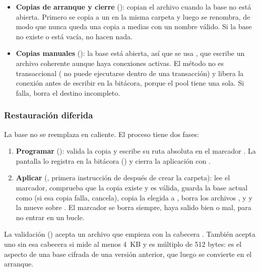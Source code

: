 \begin{itemize}
	\item \textbf{Copias de arranque y cierre} (): copian el archivo
	       cuando la base no está abierta. Primero se copia a un  en la misma carpeta y luego se
	      renombra, de modo que nunca queda una copia a medias con un nombre válido. Si la base no existe o está vacía, no
	      hacen nada.
	\item \textbf{Copias manuales} (): la base está abierta, así que se
	      usa , que escribe un archivo coherente aunque haya conexiones activas. El método
	      no es transaccional ( no puede ejecutarse dentro de una transacción) y libera la conexión antes de
	      escribir en la bitácora, porque el pool tiene una sola. Si falla, borra el destino incompleto.
\end{itemize}

\subsubsection{Restauración diferida}

La base no se reemplaza en caliente. El proceso tiene dos fases:

\begin{enumerate}
	\item \textbf{Programar} (): valida la copia y escribe su ruta absoluta en
	      el marcador . La pantalla lo registra en la bitácora
	      () y cierra la aplicación con .
	\item \textbf{Aplicar} (, primera instrucción de  después
	      de crear la carpeta): lee el marcador, comprueba que la copia existe y es válida, guarda la base actual como
	       (si esa copia falla, cancela), copia la elegida a ,
	      borra los archivos ,  y  y la mueve sobre . El marcador
	      se borra siempre, haya salido bien o mal, para no entrar en un bucle.
\end{enumerate}

La validación () acepta un archivo que empieza con la cabecera
. También acepta uno sin esa cabecera si mide al menos 4~KB y es múltiplo de 512
bytes: es el aspecto de una base cifrada de una versión anterior, que luego se convierte en el arranque.

